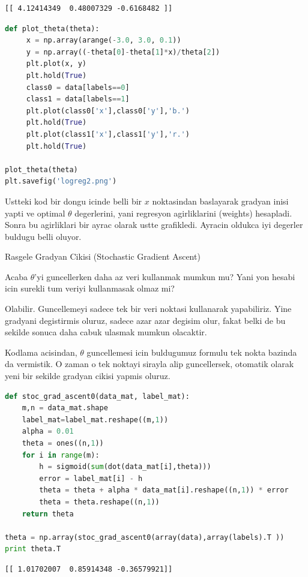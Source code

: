 \documentclass[12pt,fleqn]{article}\usepackage{../common}
\begin{document}
\begin{verbatim}
[[ 4.12414349  0.48007329 -0.6168482 ]]
\end{verbatim}


\begin{lstlisting}[language=Python]
def plot_theta(theta):
     x = np.array(arange(-3.0, 3.0, 0.1))
     y = np.array((-theta[0]-theta[1]*x)/theta[2])
     plt.plot(x, y)
     plt.hold(True)
     class0 = data[labels==0]
     class1 = data[labels==1]
     plt.plot(class0['x'],class0['y'],'b.')
     plt.hold(True)
     plt.plot(class1['x'],class1['y'],'r.')
     plt.hold(True)

plot_theta(theta)
plt.savefig('logreg2.png')
\end{lstlisting}

Ustteki kod bir dongu icinde belli bir $x$ noktasindan baslayarak gradyan
inisi yapti ve optimal $\theta$ degerlerini, yani regresyon agirliklarini
(weights) hesapladi. Sonra bu agirliklari bir ayrac olarak ustte grafikledi. 
Ayracin oldukca iyi degerler buldugu belli oluyor.

Rasgele Gradyan Cikisi (Stochastic Gradient Ascent)

Acaba $\theta$'yi guncellerken daha az veri kullanmak mumkun mu? Yani
yon hesabi icin surekli tum veriyi kullanmasak olmaz mi?

Olabilir. Guncellemeyi sadece tek bir veri noktasi kullanarak
yapabiliriz. Yine gradyani degistirmis oluruz, sadece azar azar
degisim olur, fakat belki de bu sekilde sonuca daha cabuk ulasmak
mumkun olacaktir.

Kodlama acisindan, $\theta$ guncellemesi icin buldugumuz formulu tek
nokta bazinda da vermistik.  O zaman o tek noktayi sirayla alip
guncellersek, otomatik olarak yeni bir sekilde gradyan cikisi yapmis
oluruz.

\begin{lstlisting}[language=Python]
def stoc_grad_ascent0(data_mat, label_mat):
    m,n = data_mat.shape
    label_mat=label_mat.reshape((m,1))
    alpha = 0.01
    theta = ones((n,1))
    for i in range(m):
        h = sigmoid(sum(dot(data_mat[i],theta)))
        error = label_mat[i] - h
        theta = theta + alpha * data_mat[i].reshape((n,1)) * error
        theta = theta.reshape((n,1))
    return theta

theta = np.array(stoc_grad_ascent0(array(data),array(labels).T ))
print theta.T
\end{lstlisting}

\begin{verbatim}
[[ 1.01702007  0.85914348 -0.36579921]]
\end{verbatim}
\end{document}
